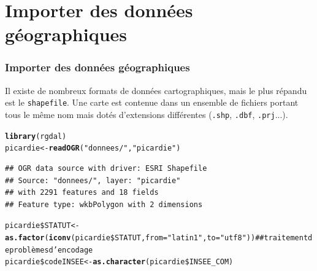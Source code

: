 \documentclass[slidetop, 10pt]{beamer}\usepackage{graphicx, color}
\makeatletter
\newcommand{\hlfunctioncall}[1]{\textcolor[rgb]{0.501960784313725,0,0.329411764705882}{\textbf{#1}}}%
\newcommand{\hlstring}[1]{\textcolor[rgb]{0.6,0.6,1}{#1}}%
\newenvironment{kframe}{%
 \def\at@end@of@kframe{}%
 \ifinner\ifhmode%
  \def\at@end@of@kframe{\end{minipage}}%
  \begin{minipage}{\columnwidth}%
 \fi\fi%
 \def\FrameCommand##1{\hskip\@totalleftmargin \hskip-\fboxsep
 \colorbox{shadecolor}{##1}\hskip-\fboxsep
     \hskip-\linewidth \hskip-\@totalleftmargin \hskip\columnwidth}%
 \MakeFramed {\advance\hsize-\width
   \@totalleftmargin\z@ \linewidth\hsize
   \@setminipage}}%
 {\par\unskip\endMakeFramed%
 \at@end@of@kframe}
\newenvironment{knitrout}{}{} %
\renewenvironment{knitrout}{\begin{tiny}}{\end{tiny}}
\makeatother
\begin{document}
\section{Importer des données géographiques}
\begin{frame}[fragile]
\frametitle{Importer des données géographiques}

Il existe de nombreux formats de données cartographiques, mais le plus répandu est le \verb!shapefile!. Une carte est contenue dans un ensemble de fichiers portant tous le même nom mais dotés d'extensions différentes (\verb!.shp!, \verb!.dbf!, \verb!.prj!...). 

\begin{knitrout}\tiny
{}\color{fgcolor}\begin{kframe}
\begin{alltt}
\hlfunctioncall{library}(rgdal)
picardie <- \hlfunctioncall{readOGR}(\hlstring{"donnees/"}, \hlstring{"picardie"})
\end{alltt}
\begin{verbatim}
## OGR data source with driver: ESRI Shapefile 
## Source: "donnees/", layer: "picardie"
## with 2291 features and 18 fields
## Feature type: wkbPolygon with 2 dimensions
\end{verbatim}
\begin{alltt}
picardie\$STATUT <- \hlfunctioncall{as.factor}(\hlfunctioncall{iconv}(picardie\$STATUT, from = \hlstring{"latin1"}, to = \hlstring{"utf8"}))  ## traitement de problèmes d'encodage
picardie\$codeINSEE <- \hlfunctioncall{as.character}(picardie\$INSEE_COM)
\end{alltt}
\end{kframe}
\end{knitrout}

\end{frame}
\end{document}
